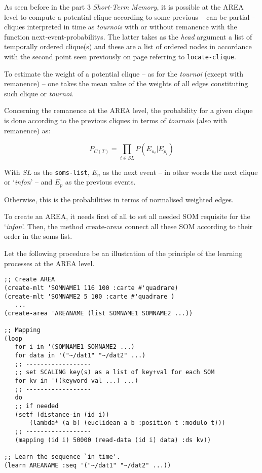 \bigskip

As seen before in the part 3 \textsl{Short-Term Memory}, it is possible at the AREA level to compute a potential clique according to some previous -- can be partial -- cliques interpreted in time as \textit{tournois} with or without remanence with the function \glspl{next-event-probability}. The latter takes as the \textit{head} argument a list of temporally ordered clique(s) and these are a list of ordered nodes in accordance with the second point seen previously on page \pageref{txt:on} referring to \texttt{locate-clique}.

\smallskip

To estimate the weight of a potential clique -- as for the \textit{tournoi} (except with remanence) -- one takes the mean value of the weights of all edges constituting such clique or \textit{tournoi}. 

\smallskip
\newpage
Concerning the remanence at the AREA level, the probability for a given clique is done according to the previous cliques in terms of \textit{tournois} (also with remanence) as:

$$P_{C(T)} = \displaystyle \prod_{i \in SL} P(E_{n_i}|E_{p_i})$$

With $SL$ as the \texttt{soms-list}, $E_{n}$ as the next event -- in other words the next clique or `\textit{infon}' -- and  $E_{p}$ as the previous events.

\smallskip

Otherwise, this is the probabilities in terms of normalised weighted edges.

\bigskip
\bigskip


\bigskip

To create an AREA, it needs first of all to set all needed SOM requisite for the `\textit{infon}'. Then, the method \glspl{create-area} connect all these SOM according to their order in the soms-list.

\bigskip

Let the following procedure be an illustration of the principle of the learning processes at the AREA level.

\begin{lstlisting}[language=N3]
;; Create AREA
(create-mlt 'SOMNAME1 116 100 :carte #'quadrare)
(create-mlt 'SOMNAME2 5 100 :carte #'quadrare )
   ...
(create-area 'AREANAME (list SOMNAME1 SOMNAME2 ...))

;; Mapping 
(loop
   for i in '(SOMNAME1 SOMNAME2 ...)
   for data in '("~/dat1" "~/dat2" ...)
   ;; ------------------
   ;; set SCALING key(s) as a list of key+val for each SOM
   for kv in '((keyword val ...) ...) 
   ;; ------------------
   do
   ;; if needed
   (setf (distance-in (id i))
	   (lambda* (a b) (euclidean a b :position t :modulo t)))
   ;; ------------------
   (mapping (id i) 50000 (read-data (id i) data) :ds kv))
       
;; Learn the sequence `in time'.
(learn AREANAME :seq '("~/dat1" "~/dat2" ...))
\end{lstlisting}

